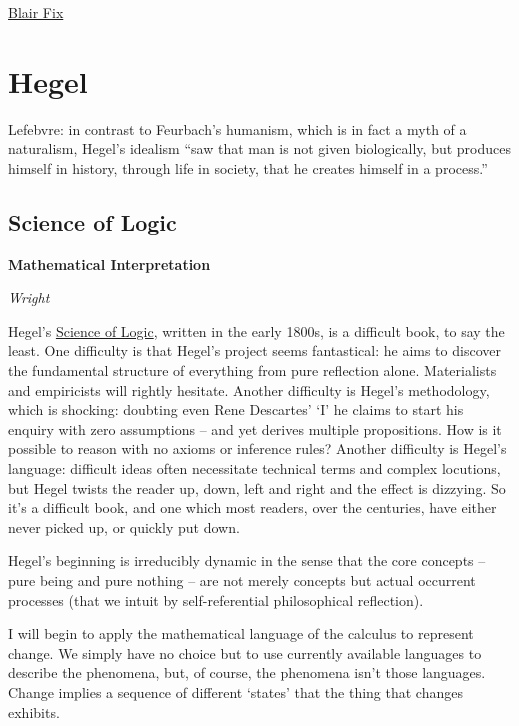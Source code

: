 \documentclass[
]{book}
\begin{document}
\href{https://capitalaspower.com/casp-forum/topic/questions-regarding-mumfords-theory-of-the-mega-machine/}{Blair Fix}

\hypertarget{hegel}{%
\chapter{Hegel}\label{hegel}}

Lefebvre: in contrast to Feurbach's humanism, which is in fact a myth of a naturalism, Hegel's idealism ``saw that man is not given biologically, but produces himself in history, through life in society, that he creates himself in a process.''

\hypertarget{science-of-logic}{%
\section{Science of Logic}\label{science-of-logic}}

\textbf{Mathematical Interpretation}

\emph{Wright}

Hegel's \href{https://www.marxists.org/reference/archive/hegel/works/hl/hl000.htm}{Science of Logic}, written in the early 1800s, is a difficult book, to say the least. One difficulty is that Hegel's project seems fantastical: he aims to discover the fundamental structure of everything from pure reflection alone. Materialists and empiricists will rightly hesitate. Another difficulty is Hegel's methodology, which is shocking: doubting even Rene Descartes' `I' he claims to start his enquiry with zero assumptions -- and yet derives multiple propositions. How is it possible to reason with no axioms or inference rules? Another difficulty is Hegel's language: difficult ideas often necessitate technical terms and complex locutions, but Hegel twists the reader up, down, left and right and the effect is dizzying. So it's a difficult book, and one which most readers, over the centuries, have either never picked up, or quickly put down.

Hegel's beginning is irreducibly dynamic in the sense that the core concepts -- pure being and pure nothing -- are not merely concepts but actual occurrent processes (that we intuit by self-referential philosophical reflection).

I will begin to apply the mathematical language of the calculus to represent change.
We simply have no choice but to use currently available languages to describe the phenomena, but, of course, the phenomena isn't those languages.
Change implies a sequence of different `states' that the thing that changes exhibits.
\end{document}
